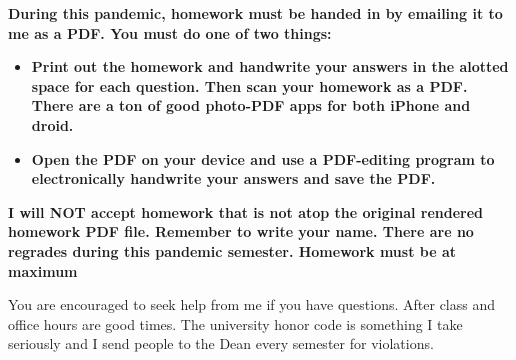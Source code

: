 


\textbf{During this pandemic, homework must be handed in by emailing it to me as a PDF. You must do one of two things:}

\begin{itemize}
\item \textbf{Print out the homework and handwrite your answers in the alotted space for each question. Then scan your homework as a PDF. There are a ton of good photo-PDF apps for both iPhone and droid. }
\item \textbf{Open the PDF on your device and use a PDF-editing program to electronically handwrite your answers and save the PDF.}
\end{itemize}

\textbf{I will NOT accept homework that is not atop the original rendered homework PDF file. Remember to write your name. There are no regrades during this pandemic semester. Homework must be at maximum }

You are encouraged to seek help from me if you have questions. After class and office hours are good times.   The university honor code is something I take seriously and I send people to the Dean every semester for violations.